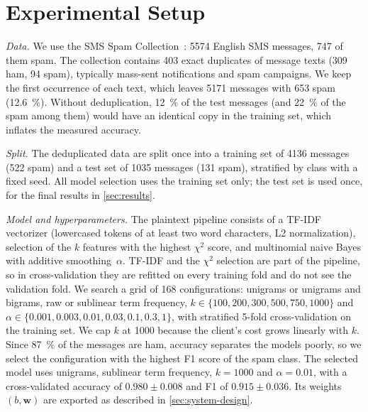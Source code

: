 \section{Experimental Setup}\label{sec:setup}

\textit{Data.}
We use the SMS Spam Collection~\cite{smsspam}: \num{5574} English SMS messages, \num{747} of them spam.
The collection contains \num{403} exact duplicates of message texts (\num{309} ham, \num{94} spam), typically mass-sent notifications and spam campaigns.
We keep the first occurrence of each text, which leaves \num{5171} messages with \num{653} spam (\SI{12.6}{\percent}).
Without deduplication, \SI{12}{\percent} of the test messages (and \SI{22}{\percent} of the spam among them) would have an identical copy in the training set, which inflates the measured accuracy.

\textit{Split.}
The deduplicated data are split once into a training set of \num{4136} messages (\num{522} spam) and a test set of \num{1035} messages (\num{131} spam), stratified by class with a fixed seed.
All model selection uses the training set only; the test set is used once, for the final results in \cref{sec:results}.

\textit{Model and hyperparameters.}
The plaintext pipeline consists of a TF-IDF vectorizer (lowercased tokens of at least two word characters, L2 normalization), selection of the $k$ features with the highest $\chi^2$ score, and multinomial naive Bayes with additive smoothing~$\alpha$.
TF-IDF and the $\chi^2$ selection are part of the pipeline, so in cross-validation they are refitted on every training fold and do not see the validation fold.
We search a grid of 168 configurations: unigrams or unigrams and bigrams, raw or sublinear term frequency, $k \in \{100, 200, 300, 500, 750, 1000\}$ and $\alpha \in \{0.001, 0.003, 0.01, 0.03, 0.1, 0.3, 1\}$, with stratified 5-fold cross-validation on the training set.
We cap $k$ at \num{1000} because the client's cost grows linearly with $k$.
Since \SI{87}{\percent} of the messages are ham, accuracy separates the models poorly, so we select the configuration with the highest F1 score of the spam class.
The selected model uses unigrams, sublinear term frequency, $k = 1000$ and $\alpha = 0.01$, with a cross-validated accuracy of $0.980 \pm 0.008$ and F1 of $0.915 \pm 0.036$.
Its weights $(b, \mathbf{w})$ are exported as described in \cref{sec:system-design}.

